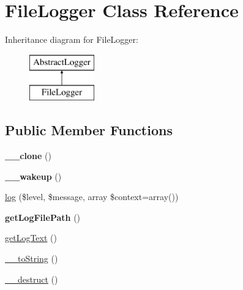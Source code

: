 \hypertarget{class_pes_1_1_logger_1_1_file_logger}{}\section{File\+Logger Class Reference}
\label{class_pes_1_1_logger_1_1_file_logger}
Inheritance diagram for File\+Logger\+:\begin{figure}[H]
\begin{center}
\leavevmode
\includegraphics[height=2.000000cm]{class_pes_1_1_logger_1_1_file_logger}
\end{center}
\end{figure}
\subsection*{Public Member Functions}
\begin{DoxyCompactItemize}
\item 
\mbox{\label{class_pes_1_1_logger_1_1_file_logger_ad0cb87b388bc74d63dc884accdca8713}} 
{\bfseries \+\_\+\+\_\+clone} ()
\item 
\mbox{\label{class_pes_1_1_logger_1_1_file_logger_a19dd44fe063cfd1cbafe97452e57666c}} 
{\bfseries \+\_\+\+\_\+wakeup} ()
\item 
\mbox{\hyperlink{class_pes_1_1_logger_1_1_file_logger_a142f6bf4e86dc16e0bae4cff1de0dd44}{log}} (\$level, \$message, array \$context=array())
\item 
\mbox{\label{class_pes_1_1_logger_1_1_file_logger_a1b5c6bbd99933e67397d80f3b950f76d}} 
{\bfseries get\+Log\+File\+Path} ()
\item 
\mbox{\hyperlink{class_pes_1_1_logger_1_1_file_logger_af6241fe7e24b92b848c0341d8e134211}{get\+Log\+Text}} ()
\item 
\mbox{\hyperlink{class_pes_1_1_logger_1_1_file_logger_a7516ca30af0db3cdbf9a7739b48ce91d}{\+\_\+\+\_\+to\+String}} ()
\item 
\mbox{\hyperlink{class_pes_1_1_logger_1_1_file_logger_a421831a265621325e1fdd19aace0c758}{\+\_\+\+\_\+destruct}} ()
\end{DoxyCompactItemize}
